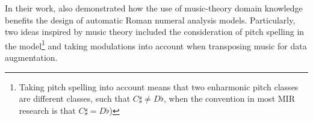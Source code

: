 

In their work, \textcite{micchi2020not} also demonstrated how the use of music-theory domain knowledge benefits the design of automatic Roman numeral analysis models. Particularly, two ideas inspired by music theory included the consideration of pitch spelling in the model\footnote{Taking pitch spelling into account means that two enharmonic pitch classes are different classes, such that $C\sharp \neq D\flat$, when the convention in most MIR research is that $C\sharp = D\flat$)} and taking modulations into account when transposing music for data augmentation.
